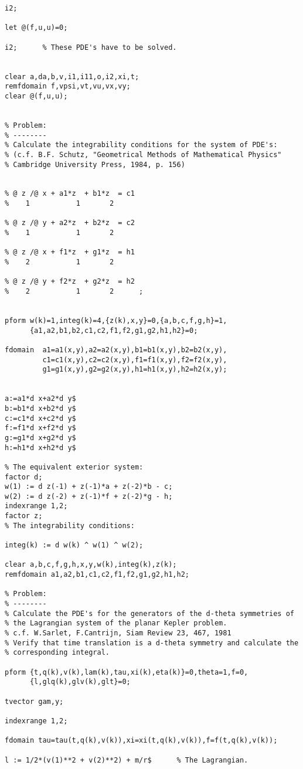 {\begin{verbatim}
i2;

let @(f,u,u)=0;

i2;      % These PDE's have to be solved.


clear a,da,b,v,i1,i11,o,i2,xi,t;
remfdomain f,vpsi,vt,vu,vx,vy;
clear @(f,u,u);


% Problem:
% --------
% Calculate the integrability conditions for the system of PDE's:
% (c.f. B.F. Schutz, "Geometrical Methods of Mathematical Physics"
% Cambridge University Press, 1984, p. 156)


% @ z /@ x + a1*z  + b1*z  = c1
%    1           1       2

% @ z /@ y + a2*z  + b2*z  = c2
%    1           1       2

% @ z /@ x + f1*z  + g1*z  = h1
%    2           1       2

% @ z /@ y + f2*z  + g2*z  = h2
%    2           1       2      ;


pform w(k)=1,integ(k)=4,{z(k),x,y}=0,{a,b,c,f,g,h}=1,
      {a1,a2,b1,b2,c1,c2,f1,f2,g1,g2,h1,h2}=0;

fdomain  a1=a1(x,y),a2=a2(x,y),b1=b1(x,y),b2=b2(x,y),
         c1=c1(x,y),c2=c2(x,y),f1=f1(x,y),f2=f2(x,y),
         g1=g1(x,y),g2=g2(x,y),h1=h1(x,y),h2=h2(x,y);


a:=a1*d x+a2*d y$
b:=b1*d x+b2*d y$
c:=c1*d x+c2*d y$
f:=f1*d x+f2*d y$
g:=g1*d x+g2*d y$
h:=h1*d x+h2*d y$

% The equivalent exterior system:
factor d;
w(1) := d z(-1) + z(-1)*a + z(-2)*b - c;
w(2) := d z(-2) + z(-1)*f + z(-2)*g - h;
indexrange 1,2;
factor z;
% The integrability conditions:

integ(k) := d w(k) ^ w(1) ^ w(2);

clear a,b,c,f,g,h,x,y,w(k),integ(k),z(k);
remfdomain a1,a2,b1,c1,c2,f1,f2,g1,g2,h1,h2;

% Problem:
% --------
% Calculate the PDE's for the generators of the d-theta symmetries of
% the Lagrangian system of the planar Kepler problem.
% c.f. W.Sarlet, F.Cantrijn, Siam Review 23, 467, 1981
% Verify that time translation is a d-theta symmetry and calculate the
% corresponding integral.

pform {t,q(k),v(k),lam(k),tau,xi(k),eta(k)}=0,theta=1,f=0,
      {l,glq(k),glv(k),glt}=0;

tvector gam,y;

indexrange 1,2;

fdomain tau=tau(t,q(k),v(k)),xi=xi(t,q(k),v(k)),f=f(t,q(k),v(k));

l := 1/2*(v(1)**2 + v(2)**2) + m/r$      % The Lagrangian.


\end{verbatim}}
